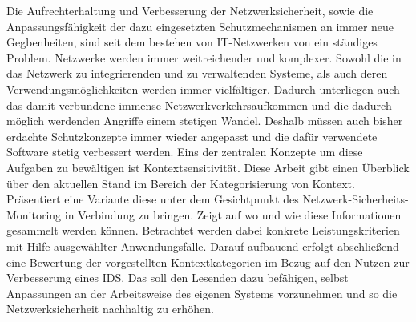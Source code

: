 Die Aufrechterhaltung und Verbesserung der Netzwerksicherheit, sowie die Anpassungsfähigkeit der dazu eingesetzten Schutzmechanismen an immer neue Gegbenheiten, sind seit dem bestehen von IT-Netzwerken von ein ständiges Problem.
Netzwerke werden immer weitreichender und komplexer. Sowohl die in das Netzwerk zu integrierenden und zu verwaltenden Systeme, als auch deren Verwendungsmöglichkeiten werden immer vielfältiger. Dadurch unterliegen auch das damit verbundene immense Netzwerkverkehrsaufkommen und die dadurch möglich werdenden Angriffe einem stetigen Wandel. Deshalb müssen auch bisher erdachte Schutzkonzepte immer wieder angepasst und die dafür verwendete Software stetig verbessert werden. Eins der zentralen Konzepte um diese Aufgaben zu bewältigen ist Kontextsensitivität.
Diese Arbeit gibt einen Überblick über den aktuellen Stand im Bereich der Kategorisierung von Kontext. Präsentiert eine Variante diese unter dem Gesichtpunkt des Netzwerk-Sicherheits-Monitoring in Verbindung zu bringen. Zeigt auf wo und wie diese Informationen gesammelt werden können. Betrachtet werden dabei konkrete Leistungskriterien mit Hilfe ausgewählter Anwendungsfälle. Darauf aufbauend erfolgt abschließend eine Bewertung der vorgestellten Kontextkategorien im Bezug auf den Nutzen zur Verbesserung eines IDS. Das soll den Lesenden dazu befähigen, selbst Anpassungen an der Arbeitsweise des eigenen Systems vorzunehmen und so die Netzwerksicherheit nachhaltig zu erhöhen. 

